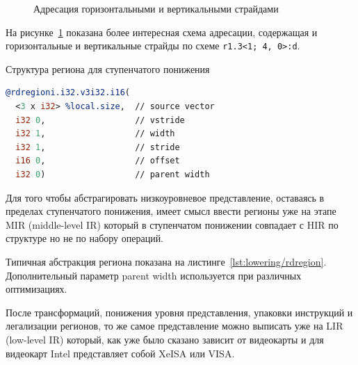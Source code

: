 \begin{figure}[ht]
    \caption{Адресация горизонтальными и вертикальными страйдами}\label{fig:genisa-addressing-reg2}
\end{figure}

На рисунке~\cref{fig:genisa-addressing-reg2} показана более интересная схема адресации, содержащая и горизонтальные и вертикальные страйды по схеме \lstinline!r1.3<1; 4, 0>:d!.

\begin{ListingEnv}[!h]
    \captiondelim{ }
    \caption{Структура региона для ступенчатого понижения}\label{lst:lowering/rdregion}
    \begin{lstlisting}[language=llvm]
@rdregioni.i32.v3i32.i16(
  <3 x i32> %local.size,  // source vector
  i32 0,                  // vstride
  i32 1,                  // width
  i32 1,                  // stride
  i16 0,                  // offset
  i32 0)                  // parent width
    \end{lstlisting}
\end{ListingEnv}

Для того чтобы абстрагировать низкоуровневое представление, оставаясь в пределах ступенчатого понижения, имеет смысл ввести регионы уже на этапе MIR (middle-level IR) который в ступенчатом понижении совпадает с HIR по структуре но не по набору операций.

Типичная абстракция региона показана на листинге~\cref{lst:lowering/rdregion}. Дополнительный параметр parent width используется при различных оптимизациях.

После трансформаций, понижения уровня представления, упаковки инструкций и легализации регионов, то же самое представление можно выписать уже на LIR (low-level IR) который, как уже было сказано зависит от видеокарты и для видеокарт Intel представляет собой XeISA или VISA.

